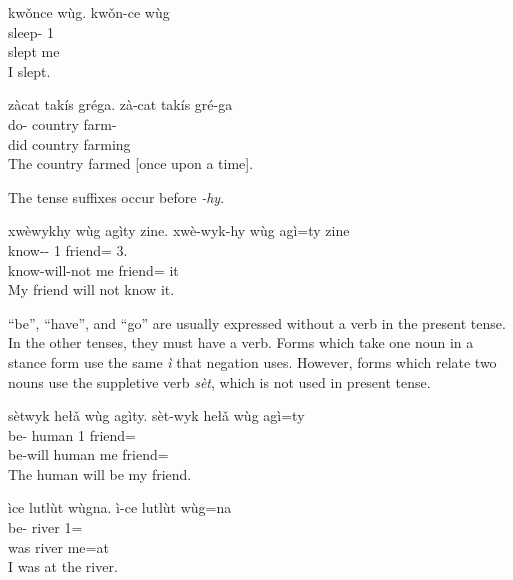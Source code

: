 \documentclass[12pt]{article}
\begin{document}
    \begin{exe}
        \ex
        \glt
        kwǒnce wùg.
        \glll
        kwǒn-ce wùg \\
        sleep-\Pst{} 1\Sg{} \\
        slept me \\
        \glt
        I slept.
    \end{exe}

    \begin{exe}
        \ex
        \glt
        zàcat takís gréga.
        \glll
        zà-cat takís gré-ga \\
        do-\Hst{} country farm-\Ger{} \\
        did country farming \\
        \glt
        The country farmed [once upon a time].
    \end{exe}

    The tense suffixes occur before \textit{-hy}.
    \begin{exe}
        \ex
        \glt
        xwèwykhy wùg agìty zine.
        \glll
        xwè-wyk-hy wùg agì=ty zine \\
        know-\Fut{}-\Neg{} 1\Sg{} friend=\Poss{} 3\Sg{}.\Inanim{} \\
        know-will-not me friend=\Poss{} it \\
        \glt
        My friend will not know it.
    \end{exe}

    ``be'', ``have'', and ``go''
    are usually expressed without a verb in the present tense.
    In the other tenses, they must have a verb.
    Forms which take one noun in a stance form use the same \textit{ì}
    that negation uses.
    However, forms which relate two nouns
    use the suppletive verb \textit{sèt}, which is not used in present tense.

    \begin{exe}
        \ex
        \glt
        sètwyk hełǎ wùg agìty.
        \glll
        sèt-wyk hełǎ wùg agì=ty \\
        be-\Fut{} human 1\Sg{} friend=\Poss{} \\
        be-will human me friend=\Poss{} \\
        \glt
        The human will be my friend.
    \end{exe}

    \begin{exe}
        \ex
        \glt
        ìce lutlùt wùgna.
        \glll
        ì-ce lutlùt wùg=na \\
        be-\Pst{} river 1\Sg{}=\AdessTwo{} \\
        was river me=at \\
        \glt
        I was at the river.
    \end{exe}
\end{document}
